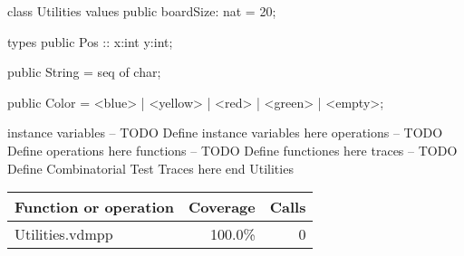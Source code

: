 \begin{vdm_al}
class Utilities
 values
  public boardSize: nat = 20;

 types
        public Pos :: x:int y:int;
        
  public String = seq of char;
  
  public Color = <blue> | <yellow> | <red> | <green> | <empty>;
  
 instance variables
-- TODO Define instance variables here
 operations
-- TODO Define operations here
 functions
-- TODO Define functiones here
 traces
-- TODO Define Combinatorial Test Traces here
end Utilities
\end{vdm_al}
\bigskip
\begin{longtable}{|l|r|r|}
\hline
Function or operation & Coverage & Calls \\
\hline
\hline
\hline
Utilities.vdmpp & 100.0\% & 0 \\
\hline
\end{longtable}

